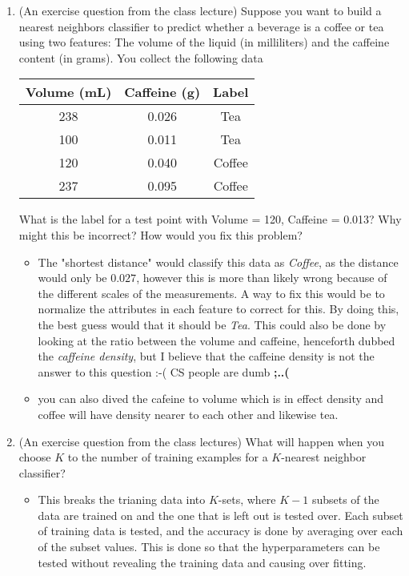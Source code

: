 \documentclass{article}
\begin{document}
\begin{enumerate}
\item (An exercise question from the class lecture) Suppose you want to build a nearest neighbors classifier to predict whether a beverage is a coffee or tea using two features: The volume of the liquid (in milliliters) and the caffeine content (in grams). You collect the following data
\begin{center}
\begin{tabular}{|c c | c|}
\hline
{\bf Volume (mL)} & {\bf Caffeine (g)} & {\bf Label}\\
\hline
238 & 0.026 & Tea\\
100 & 0.011 & Tea\\
120 & 0.040 & Coffee\\
237 & 0.095 & Coffee\\
\hline
\end{tabular}
\end{center}

What is the label for a test point with Volume = 120, Caffeine = 0.013? Why might this be incorrect? How would you fix this problem?


	\begin{itemize}
	\item The "shortest distance" would classify this data as {\em Coffee}, as the distance would only be $0.027$, however this is more than likely wrong because of the different scales of the measurements. A way to fix this would be to normalize the attributes in each feature to correct for this. By doing this, the best guess would that it should be {\em Tea}. This could also be done by looking at the ratio between the volume and caffeine, henceforth dubbed the {\em caffeine density}, but I believe that the caffeine density is not the answer to this question :-( {\scriptsize CS people are dumb} \textbf{;..(}
	\item you can also dived the cafeine to volume which is in effect density and coffee will have density nearer to each other and likewise tea.
	\end{itemize}




\item (An exercise question from the class lectures) What will happen when you choose $K$ to the number of training examples for a $K$-nearest neighbor classifier?


	\begin{itemize}
	\item This breaks the trianing data into $K$-sets, where $K-1$ subsets of the data are trained on and the one that is left out is tested over. Each subset of training data is tested, and the accuracy is done by averaging over each of the subset values. This is done so that the hyperparameters can be tested without revealing the training data and causing over fitting.
	\end{itemize}




\end{enumerate}
\end{document}
